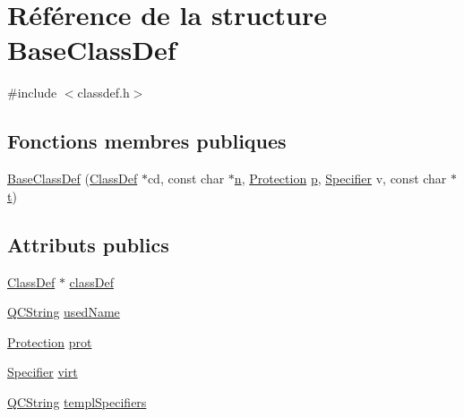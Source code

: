\hypertarget{struct_base_class_def}{}\section{Référence de la structure Base\+Class\+Def}
\label{struct_base_class_def}


{\ttfamily \#include $<$classdef.\+h$>$}

\subsection*{Fonctions membres publiques}
\begin{DoxyCompactItemize}
\item 
\hyperlink{struct_base_class_def_aa80f7dccec0c358dc35378e4d211f1b2}{Base\+Class\+Def} (\hyperlink{class_class_def}{Class\+Def} $\ast$cd, const char $\ast$\hyperlink{060__command__switch_8tcl_acdde3cd86eb2421ce8dbb2e85227d368}{n}, \hyperlink{types_8h_a90e352184df58cd09455fe9996cd4ded}{Protection} \hyperlink{060__command__switch_8tcl_a15229b450f26d8fa1c10bea4f3279f4d}{p}, \hyperlink{types_8h_ab16236bdd10ddf4d73a9847350f0017e}{Specifier} v, const char $\ast$\hyperlink{058__bracket__recursion_8tcl_a69e959f6901827e4d8271aeaa5fba0fc}{t})
\end{DoxyCompactItemize}
\subsection*{Attributs publics}
\begin{DoxyCompactItemize}
\item 
\hyperlink{class_class_def}{Class\+Def} $\ast$ \hyperlink{struct_base_class_def_a2a62f0f7057f4cd514f3d1417191ff26}{class\+Def}
\item 
\hyperlink{class_q_c_string}{Q\+C\+String} \hyperlink{struct_base_class_def_ae7703a5a743ee3b6c066d8037fc71f4e}{used\+Name}
\item 
\hyperlink{types_8h_a90e352184df58cd09455fe9996cd4ded}{Protection} \hyperlink{struct_base_class_def_ab5a986f56300bfa53f7c4cff58196294}{prot}
\item 
\hyperlink{types_8h_ab16236bdd10ddf4d73a9847350f0017e}{Specifier} \hyperlink{struct_base_class_def_a844100c6fcd90233e01e52fc92107464}{virt}
\item 
\hyperlink{class_q_c_string}{Q\+C\+String} \hyperlink{struct_base_class_def_a2b8a712d468d70c6c80b5c07f49711ae}{templ\+Specifiers}
\end{DoxyCompactItemize}


